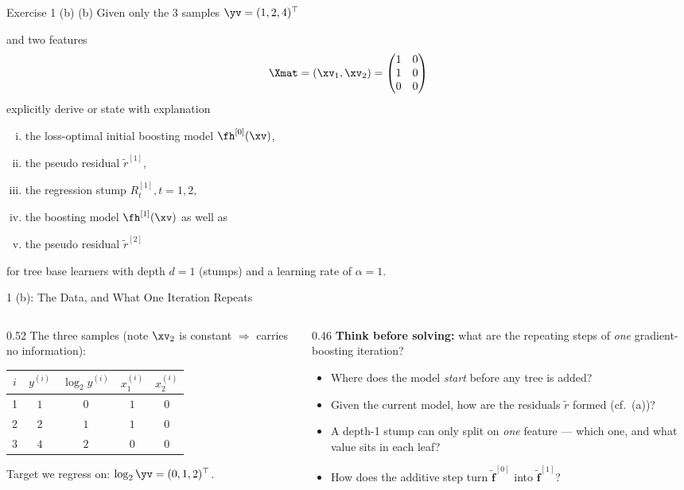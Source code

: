 \documentclass[aspectratio=169]{beamer}
\newcommand{\fhx}[1]{\fh^{[#1]}(\xv)}
\newcommand{\rtilde}[1]{\tilde{r}^{[#1]}}
\newcommand{\Rt}[1]{R_t^{[#1]}}
\newcommand{\fhv}[1]{\tilde{\bm{f}}^{[#1]}}
\begin{document}
\begin{frame}{Exercise 1 (b)}
	\small
	(b) Given only the 3 samples $\yv = (1, 2, 4)^\top$

	and two features
	$$\Xmat = (\xv_1, \xv_2) =
		\begin{pmatrix}
			1 & 0 \\
			1 & 0 \\
			0 & 0 \\
		\end{pmatrix}
	$$
	explicitly derive or state with explanation
	\begin{enumerate}[(i)]
		\item the loss-optimal initial boosting model $\fhx{0}$,
		\item the pseudo residual $\rtilde{1}$,
		\item the regression stump $\Rt{1}, t = 1, 2$,
		\item the boosting model $\fhx{1}$ as well as
		\item the pseudo residual $\rtilde{2}$
	\end{enumerate}
	for tree base learners with depth $d = 1$ (stumps) and a learning rate of $\alpha = 1$.
\end{frame}

\begin{frame}{1 (b): The Data, and What One Iteration Repeats}
	\small
	\begin{columns}[T]
	\begin{column}{0.52\textwidth}
	The three samples (note $\xv_2$ is constant $\Rightarrow$ carries no information):
	\medskip
	\begin{center}
	\renewcommand{\arraystretch}{1.2}
	\begin{tabular}{@{}ccccc@{}}
		\toprule
		$i$ & $y^{(i)}$ & $\log_2 y^{(i)}$ & $x_1^{(i)}$ & $x_2^{(i)}$ \\
		\midrule
		1 & $1$ & $0$ & $1$ & $0$ \\
		2 & $2$ & $1$ & $1$ & $0$ \\
		3 & $4$ & $2$ & $0$ & $0$ \\
		\bottomrule
	\end{tabular}
	\end{center}
	\medskip
	Target we regress on: $\log_2\yv = (0,1,2)^\top$.
	\end{column}
	\begin{column}{0.46\textwidth}
	\textbf{Think before solving:} what are the repeating steps of \emph{one} gradient-boosting iteration?
	\medskip
	\begin{itemize}
		\setlength{\itemsep}{6pt}
		\item<2-> Where does the model \emph{start} before any tree is added?
		\item<3-> Given the current model, how are the residuals $\tilde r$ formed (cf.\ (a))?
		\item<4-> A depth-1 stump can only split on \emph{one} feature --- which one, and what value sits in each leaf?
		\item<5-> How does the additive step turn $\fhv{0}$ into $\fhv{1}$?
	\end{itemize}
	\end{column}
	\end{columns}
\end{frame}
\end{document}
